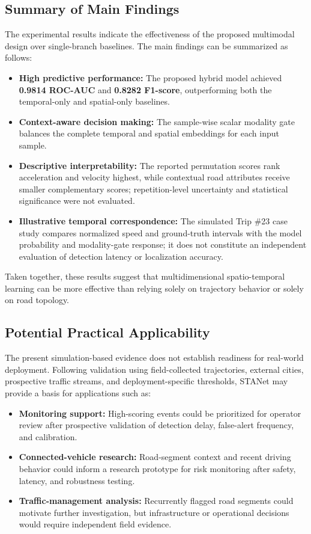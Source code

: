 \documentclass[journal]{IEEEtran}
\begin{document}
\subsection{Summary of Main Findings}
The experimental results indicate the effectiveness of the proposed multimodal design over single-branch baselines. The main findings can be summarized as follows:
\begin{itemize}
  \item \textbf{High predictive performance:} The proposed hybrid model achieved \textbf{0.9814 ROC-AUC} and \textbf{0.8282 F1-score}, outperforming both the temporal-only and spatial-only baselines.
  \item \textbf{Context-aware decision making:} The sample-wise scalar modality gate balances the complete temporal and spatial embeddings for each input sample.
  \item \textbf{Descriptive interpretability:} The reported permutation scores rank acceleration and velocity highest, while contextual road attributes receive smaller complementary scores; repetition-level uncertainty and statistical significance were not evaluated.
  \item \textbf{Illustrative temporal correspondence:} The simulated Trip \#23 case study compares normalized speed and ground-truth intervals with the model probability and modality-gate response; it does not constitute an independent evaluation of detection latency or localization accuracy.
\end{itemize}

Taken together, these results suggest that multidimensional spatio-temporal learning can be more effective than relying solely on trajectory behavior or solely on road topology.

\subsection{Potential Practical Applicability}
The present simulation-based evidence does not establish readiness for real-world deployment. Following validation using field-collected trajectories, external cities, prospective traffic streams, and deployment-specific thresholds, STANet may provide a basis for applications such as:
\begin{itemize}
  \item \textbf{Monitoring support:} High-scoring events could be prioritized for operator review after prospective validation of detection delay, false-alert frequency, and calibration.
  \item \textbf{Connected-vehicle research:} Road-segment context and recent driving behavior could inform a research prototype for risk monitoring after safety, latency, and robustness testing.
  \item \textbf{Traffic-management analysis:} Recurrently flagged road segments could motivate further investigation, but infrastructure or operational decisions would require independent field evidence.
\end{itemize}
\end{document}

